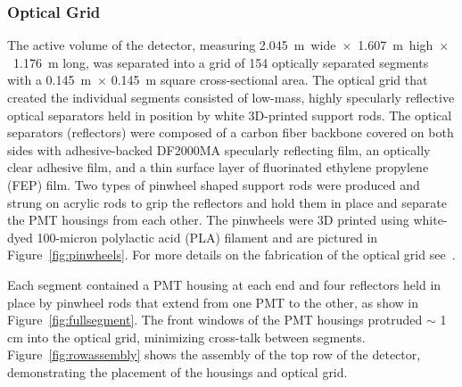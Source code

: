 \subsubsection{Optical Grid}

The active volume of the detector, measuring 2.045~m~wide~$\times$~1.607~m~high~$\times$~1.176~m long, was separated into a grid of 154 optically separated segments with a 0.145~m~$\times$ 0.145~m square cross-sectional area. 
The optical grid that created the individual segments consisted of low-mass, highly specularly reflective optical separators held in position by white 3D-printed support rods. 
The optical separators (reflectors) were composed of a carbon fiber backbone covered on both sides with adhesive-backed DF2000MA specularly reflecting film, an optically clear adhesive film, and a thin surface layer of fluorinated ethylene propylene (FEP) film.
Two types of pinwheel shaped support rods were produced and strung on acrylic rods to grip the reflectors and hold them in place and separate the PMT housings from each other.
The pinwheels were 3D printed using white-dyed 100-micron polylactic acid (PLA) filament and are pictured in Figure~\ref{fig:pinwheels}.
For more details on the fabrication of the optical grid see~\cite{Ashenfelter:2019lbf}.

Each segment contained a PMT housing at each end and four reflectors held in place by pinwheel rods that extend from one PMT to the other, as show in Figure~\ref{fig:fullsegment}.
The front windows of the PMT housings protruded $\sim$ 1 cm into the optical grid, minimizing cross-talk between segments. 
Figure~\ref{fig:rowassembly} shows the assembly of the top row of the detector, demonstrating the placement of the housings and optical grid. 


